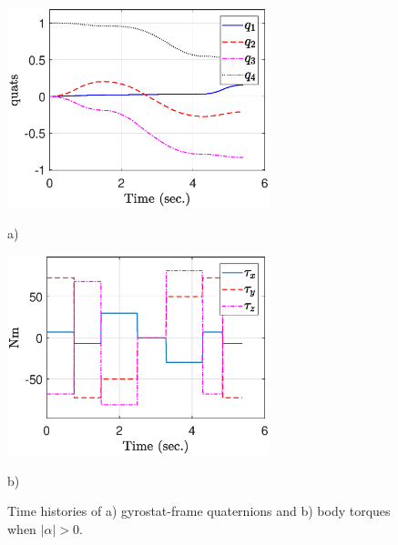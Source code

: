 \documentclass[letterpaper, paper,12pt]{AAS}		%
\begin{document}
\begin{figure}[!htb]
    \centering
    \begin{minipage}{.5\textwidth}
        \centering
\includegraphics[width=3in]{figures/alphaNot0/quats_phi_total.eps}
    \caption{a)}
        \label{fig:prob1_6_2}
    \end{minipage}%
    \begin{minipage}{0.5\textwidth}
        \centering
   \includegraphics[width=3in]{figures/alphaNot0/torque_total.eps}
        \label{fig:prob1_6_1}
       \caption{b)}
    \end{minipage}
    \caption{Time histories of a) gyrostat-frame quaternions and b) body torques when $|\alpha|>0$.}
    \label{fig:quats_phi_total}
	\end{figure}
	
\end{document}
